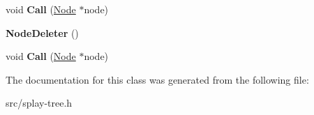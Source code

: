 \begin{DoxyCompactItemize}
\item 
\hypertarget{classv8_1_1internal_1_1_splay_tree_1_1_b_a_s_e___e_m_b_e_d_d_e_d_a07a0fd21214268a9b1f8bcbce2fd6c22}{}void {\bfseries Call} (\hyperlink{classv8_1_1internal_1_1_splay_tree_1_1_node}{Node} $\ast$node)\label{classv8_1_1internal_1_1_splay_tree_1_1_b_a_s_e___e_m_b_e_d_d_e_d_a07a0fd21214268a9b1f8bcbce2fd6c22}

\item 
\hypertarget{classv8_1_1internal_1_1_splay_tree_1_1_b_a_s_e___e_m_b_e_d_d_e_d_a4d2a7a81b4f4bb4282a44978855b5b0a}{}{\bfseries Node\+Deleter} ()\label{classv8_1_1internal_1_1_splay_tree_1_1_b_a_s_e___e_m_b_e_d_d_e_d_a4d2a7a81b4f4bb4282a44978855b5b0a}

\item 
\hypertarget{classv8_1_1internal_1_1_splay_tree_1_1_b_a_s_e___e_m_b_e_d_d_e_d_a07a0fd21214268a9b1f8bcbce2fd6c22}{}void {\bfseries Call} (\hyperlink{classv8_1_1internal_1_1_splay_tree_1_1_node}{Node} $\ast$node)\label{classv8_1_1internal_1_1_splay_tree_1_1_b_a_s_e___e_m_b_e_d_d_e_d_a07a0fd21214268a9b1f8bcbce2fd6c22}

\end{DoxyCompactItemize}


The documentation for this class was generated from the following file\+:\begin{DoxyCompactItemize}
\item 
src/splay-\/tree.\+h\end{DoxyCompactItemize}

